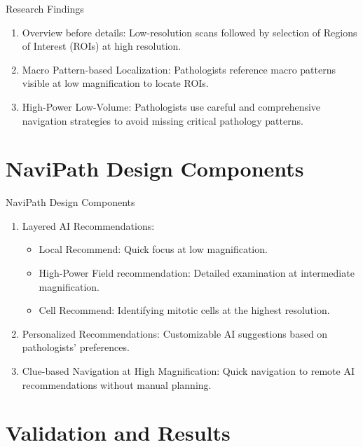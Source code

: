 \documentclass{beamer}
\begin{document}
\begin{frame}{Research Findings}
    \begin{enumerate}
        \item Overview before details: Low-resolution scans followed by selection of Regions of Interest (ROIs) at high resolution.
        \item Macro Pattern-based Localization: Pathologists reference macro patterns visible at low magnification to locate ROIs.
        \item High-Power Low-Volume: Pathologists use careful and comprehensive navigation strategies to avoid missing critical pathology patterns.
    \end{enumerate}
\end{frame}

\section{NaviPath Design Components}

\begin{frame}{NaviPath Design Components}
    \begin{enumerate}
        \item Layered AI Recommendations:
        \begin{itemize}
            \item Local Recommend: Quick focus at low magnification.
            \item High-Power Field recommendation: Detailed examination at intermediate magnification.
            \item Cell Recommend: Identifying mitotic cells at the highest resolution.
        \end{itemize}
        \item Personalized Recommendations: Customizable AI suggestions based on pathologists' preferences.
        \item Clue-based Navigation at High Magnification: Quick navigation to remote AI recommendations without manual planning.
    \end{enumerate}
\end{frame}

\section{Validation and Results}
\end{document}
